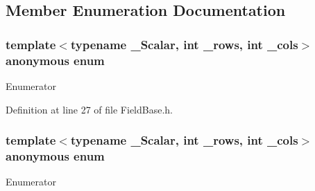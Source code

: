 \subsection{Member Enumeration Documentation}
\hypertarget{structmodel_1_1_field_base_a2b5c52dfd4efa6f57bd43131b4d4f9bc}{}\subsubsection[{anonymous enum}]{\setlength{\rightskip}{0pt plus 5cm}template$<$typename \+\_\+\+Scalar, int \+\_\+rows, int \+\_\+cols$>$ anonymous enum}\label{structmodel_1_1_field_base_a2b5c52dfd4efa6f57bd43131b4d4f9bc}
\begin{Desc}
\item[Enumerator]\par
\begin{description}
\item[{\em 
\hypertarget{structmodel_1_1_field_base_a2b5c52dfd4efa6f57bd43131b4d4f9bcac96775f58d3756f4a74c0009f4618969}{}rows\label{structmodel_1_1_field_base_a2b5c52dfd4efa6f57bd43131b4d4f9bcac96775f58d3756f4a74c0009f4618969}
}]\end{description}
\end{Desc}


Definition at line 27 of file Field\+Base.\+h.

\hypertarget{structmodel_1_1_field_base_abe4aa53dc71d5bdd1638bcaf74179c6c}{}\subsubsection[{anonymous enum}]{\setlength{\rightskip}{0pt plus 5cm}template$<$typename \+\_\+\+Scalar, int \+\_\+rows, int \+\_\+cols$>$ anonymous enum}\label{structmodel_1_1_field_base_abe4aa53dc71d5bdd1638bcaf74179c6c}
\begin{Desc}
\item[Enumerator]\par
\begin{description}
\item[{\em 
\hypertarget{structmodel_1_1_field_base_abe4aa53dc71d5bdd1638bcaf74179c6ca610bda6bda842eba5df9a4ca957db98d}{}cols\label{structmodel_1_1_field_base_abe4aa53dc71d5bdd1638bcaf74179c6ca610bda6bda842eba5df9a4ca957db98d}
}]\end{description}
\end{Desc}


